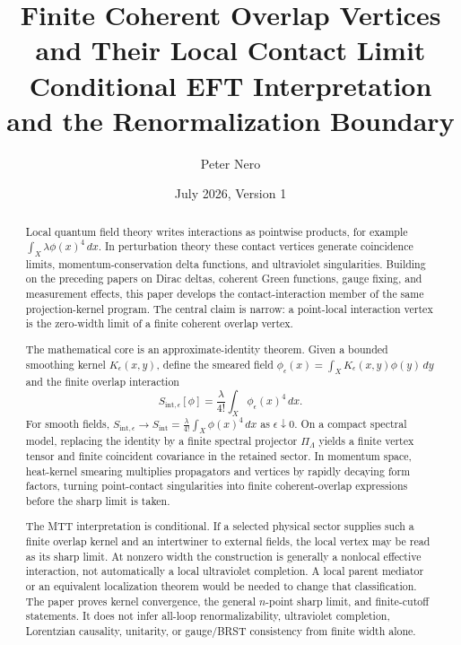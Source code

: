 \documentclass[11pt]{article}
\title{Finite Coherent Overlap Vertices and Their Local Contact Limit\\
\large Conditional EFT Interpretation and the Renormalization Boundary}
\author{Peter Nero}
\date{July 2026, Version 1}
\begin{document}
\maketitle

\begin{abstract}
Local quantum field theory writes interactions as pointwise products, for example
\(\int_X \lambda \phi(x)^4\,dx\).  In perturbation theory these contact vertices generate
coincidence limits, momentum-conservation delta functions, and ultraviolet singularities.
Building on the preceding papers on Dirac deltas, coherent Green functions, gauge fixing, and
measurement effects, this paper develops the contact-interaction member of the same
projection-kernel program.  The central claim is narrow: a point-local interaction vertex is the
zero-width limit of a finite coherent overlap vertex.

The mathematical core is an approximate-identity theorem.  Given a bounded smoothing
kernel \(K_\epsilon(x,y)\), define the smeared field
\(\phi_\epsilon(x)=\int_X K_\epsilon(x,y)\phi(y)\,dy\) and the finite overlap interaction
\[
S_{\mathrm{int},\epsilon}[\phi]
  = \frac{\lambda}{4!}\int_X \phi_\epsilon(x)^4\,dx .
\]
For smooth fields, \(S_{\mathrm{int},\epsilon}\to S_{\mathrm{int}}=
\frac{\lambda}{4!}\int_X\phi(x)^4\,dx\) as \(\epsilon\downarrow0\).  On a compact spectral
model, replacing the identity by a finite spectral projector \(\Pi_\Lambda\) yields a finite
vertex tensor and finite coincident covariance in the retained sector.  In momentum space,
heat-kernel smearing multiplies propagators and vertices by rapidly decaying form factors,
turning point-contact singularities into finite coherent-overlap expressions before the sharp
limit is taken.

The MTT interpretation is conditional.  If a selected physical sector supplies such a finite
overlap kernel and an intertwiner to external fields, the local vertex may be read as its sharp
limit.  At nonzero width the construction is generally a nonlocal effective interaction, not
automatically a local ultraviolet completion.  A local parent mediator or an equivalent
localization theorem would be needed to change that classification.  The paper proves
kernel convergence, the general \(n\)-point sharp limit, and finite-cutoff statements.  It
does not infer all-loop renormalizability, ultraviolet completion, Lorentzian causality,
unitarity, or gauge/BRST consistency from finite width alone.
\end{abstract}
\end{document}
